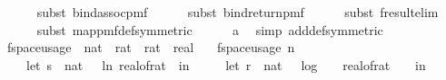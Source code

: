 \begin{isabellebody}
\ \ \ \ \isamarkupfalse%
\ {\isacharparenleft}{\kern0pt}subst\ bind{\isacharunderscore}{\kern0pt}assoc{\isacharunderscore}{\kern0pt}pmf{\isacharparenright}{\kern0pt}\isanewline
\ \ \ \ \isamarkupfalse%
\ {\isacharparenleft}{\kern0pt}subst\ bind{\isacharunderscore}{\kern0pt}return{\isacharunderscore}{\kern0pt}pmf{\isacharparenright}{\kern0pt}\isanewline
\ \ \ \ \isamarkupfalse%
\ {\isacharparenleft}{\kern0pt}subst\ f{}{\isacharunderscore}{\kern0pt}result{\isacharunderscore}{\kern0pt}elim{\isacharparenright}{\kern0pt}\isanewline
\ \ \ \ \isamarkupfalse%
\ {\isacharparenleft}{\kern0pt}subst\ map{\isacharunderscore}{\kern0pt}pmf{\isacharunderscore}{\kern0pt}def{\isacharbrackleft}{\kern0pt}symmetric{\isacharbrackright}{\kern0pt}{\isacharparenright}{\kern0pt}\isanewline
\ \ \ \ \isamarkupfalse%
\ a\ \isamarkupfalse%
\ {\isacharparenleft}{\kern0pt}simp\ add{\isacharcolon}{\kern0pt}{\isasymOmega}def{\isacharbrackleft}{\kern0pt}symmetric{\isacharbrackright}{\kern0pt}{\isacharparenright}{\kern0pt}\isanewline
{}\isamarkupfalse%
%
\endisatagproof
{\isafoldproof}%
%
\isadelimproof
\isanewline
%
\endisadelimproof
\isanewline
{}\isamarkupfalse%
\ f{}{\isacharunderscore}{\kern0pt}space{\isacharunderscore}{\kern0pt}usage\ {\isacharcolon}{\kern0pt}{\isacharcolon}{\kern0pt}\ {\isachardoublequoteopen}{\isacharparenleft}{\kern0pt}nat\ {\isasymtimes}\ rat\ {\isasymtimes}\ rat{\isacharparenright}{\kern0pt}\ {\isasymRightarrow}\ real{\isachardoublequoteclose}\ \isanewline
\ \ {\isachardoublequoteopen}f{}{\isacharunderscore}{\kern0pt}space{\isacharunderscore}{\kern0pt}usage\ {\isacharparenleft}{\kern0pt}n{\isacharcomma}{\kern0pt}\ {\isasymepsilon}{\isacharcomma}{\kern0pt}\ {\isasymdelta}{\isacharparenright}{\kern0pt}\ {\isacharequal}{\kern0pt}\ {\isacharparenleft}{\kern0pt}\isanewline
\ \ \ \ let\ s\ {\isacharequal}{\kern0pt}\ nat\ {\isasymlceil}{\isacharminus}{\kern0pt}{}{}\ {\isacharasterisk}{\kern0pt}\ ln\ {\isacharparenleft}{\kern0pt}real{\isacharunderscore}{\kern0pt}of{\isacharunderscore}{\kern0pt}rat\ {\isasymepsilon}{\isacharparenright}{\kern0pt}{\isasymrceil}\ in\ \isanewline
\ \ \ \ let\ r\ {\isacharequal}{\kern0pt}\ nat\ {\isacharparenleft}{\kern0pt}{}\ {\isacharasterisk}{\kern0pt}\ {\isasymlceil}log\ {}\ {\isacharparenleft}{\kern0pt}{}\ {\isacharslash}{\kern0pt}\ real{\isacharunderscore}{\kern0pt}of{\isacharunderscore}{\kern0pt}rat\ {\isasymdelta}{\isacharparenright}{\kern0pt}{\isasymrceil}\ {\isacharplus}{\kern0pt}\ {}{}{\isacharparenright}{\kern0pt}\ in\isanewline

\end{isabellebody}

